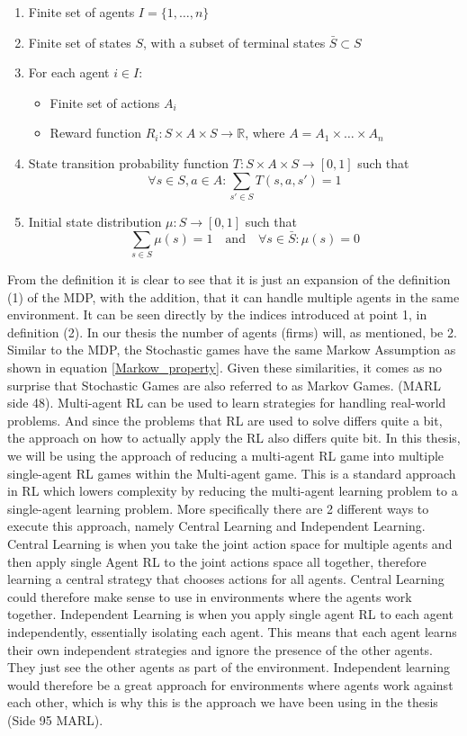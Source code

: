 \documentclass{article}
\begin{document}
\begin{enumerate}
    \item Finite set of agents \( I = \{1, \dots, n\} \)
    \item Finite set of states \( S \), with a subset of terminal states \( \bar{S} \subset S \)
    \item For each agent \( i \in I \):
    \begin{itemize}
        \item Finite set of actions \( A_i \)
        \item Reward function \( R_i: S \times A \times S\to \mathbb{R} \), where \( A = A_1 \times \dots \times A_n \)
    \end{itemize}
    \item State transition probability function \( T: S \times A \times S \to [0, 1] \) such that
    \[
    \forall s \in S, a \in A : \sum_{s' \in S} T(s, a, s') = 1
    \]
    \item Initial state distribution \( \mu: S \to [0, 1] \) such that
    \[
    \sum_{s \in S} \mu(s) = 1 \quad \text{and} \quad \forall s \in \bar{S}: \mu(s) = 0
    \]
\end{enumerate}
From the definition it is clear to see that it is just an expansion of the definition (1) of the MDP, with the addition, that it can handle multiple agents in the same environment. It can be seen directly by the indices introduced at point 1, in definition (2). In our thesis the number of agents (firms) will, as mentioned, be 2. Similar to the MDP, the Stochastic games have the same Markow Assumption as shown in equation \ref{Markow_property}. Given these similarities, it comes as no surprise that Stochastic Games are also referred to as Markov Games. (MARL side 48).
\newline 
\newline
Multi-agent RL can be used to learn strategies for handling real-world problems. And since the problems that RL are used to solve differs quite a bit, the approach on how to actually apply the RL also differs quite bit. In this thesis, we will be using the approach of reducing 
a multi-agent RL game into multiple single-agent RL games within the Multi-agent game. This is a standard approach in RL which lowers complexity by reducing the multi-agent learning problem to a single-agent learning problem. More specifically there are 2 different ways to execute this approach, namely Central Learning and Independent Learning. Central Learning is when you take the joint action space for multiple agents and then apply single Agent RL to the joint actions space all together, therefore learning a central strategy that chooses actions for all agents. Central Learning could therefore make sense to use in environments where the agents work together. Independent Learning is when you apply single agent RL to each agent independently, essentially isolating each agent. This means that each agent learns their own independent strategies and ignore the presence of the other agents. They just see the other agents as part of the environment. Independent learning would therefore be a great approach for environments where agents work against each other, which is why this is the approach we have been using in the thesis (Side 95 MARL). 
\end{document}
